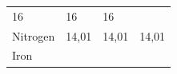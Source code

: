{\begin{tabular}[t]{|l|l|l|l|}
    
        16 &
    
    
        16 &
    
    
        16%
     \tabularnewline\cline{1-1}\cline{2-2}\cline{3-3}\cline{4-4}
    
    
        Nitrogen &
    
    
        14,01 &
    
    
        14,01 &
    
    
        14,01%
     \tabularnewline\cline{1-1}\cline{2-2}\cline{3-3}\cline{4-4}
    
    
        Iron &
    

\end{tabular}}

